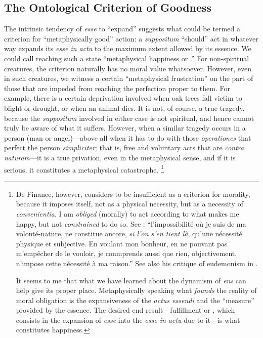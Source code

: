 \subsection{The Ontological Criterion of Goodness}

The intrinsic tendency of \emph{esse} to ``expand'' suggests what could be termed a criterion for ``metaphysically good'' action: a \emph{suppositum} ``should'' act in whatever way expands its \emph{esse in actu} to the maximum extent allowed by its essence. We could call reaching such a state ``metaphysical happiness or .''
For non-spiritual creatures, the criterion naturally has no moral value whatsoever. However, even in such creatures, we witness a certain ``metaphysical frustration'' on the part of those that are impeded from reaching the perfection proper to them. For example, there is a certain deprivation involved when oak trees fall victim to blight or drought, or when an animal dies. It is not, of course, a true tragedy, because the \emph{suppositum} involved in either case is not spiritual, and hence cannot truly be aware of what it suffers. However, when a similar tragedy occurs in a person (man or angel)---above all when it has to do with those \emph{operationes} that perfect the person \emph{simpliciter}; that is, free and voluntary acts that are \emph{contra naturam}---it is a true privation, even in the metaphysical sense, and if it is serious, it constitutes a metaphysical catastrophe.%
%
\footnote{De Finance, however, considers  to be insufficient as a criterion for morality, because it imposes itself, not as a physical necessity, but as a necessity of \emph{convenientia}. I am \emph{obliged} (morally) to act according to what makes me happy, but not \emph{constrained} to do so. See \cite[259]{definance:essai}: ``l'impossibilité où je suis  de ma volonté-nature, ne constitue ancore, \emph{si l'on s'en tient là}, qu'une nécessité physique et subjective. En voulant mon bonheur, en ne pouvant pas m'empêcher de le vouloir, je conmprends aussi que rien, objectivement, n'impose cette nécessité à ma raison.'' See also his critique of eudemonism in \cite[114--119]{definance:ethique}.

It seems to me that what we have learned about the dynamism of \emph{ens} can help give  its proper place. Metaphysically speaking what \emph{founds} the reality of moral obligation is the expansiveness of the \emph{actus essendi} and the ``measure'' provided by the essence. The desired end result---fulfillment or , which consists in the expansion of \emph{esse} into the \emph{esse in actu} due to it---is what constitutes happiness.}
%

